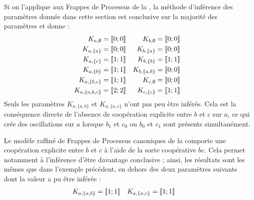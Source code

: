 \begin{example}
  Si on l'applique aux Frappes de Processus de la ,
  la méthode d'inférence des paramètres donnée dans cette section est conclusive sur la majorité
  des paramètres et donne :
  \begin{align*}
    K_{a, \emptyset} &= \mathopen{\llbracket}0\mathclose{};0\mathclose{\rrbracket} &
    K_{b, \emptyset} &= \mathopen{\llbracket}0\mathclose{};0\mathclose{\rrbracket} \\
    K_{a, \{a\}} &= \mathopen{\llbracket}0\mathclose{};0\mathclose{\rrbracket} &
    K_{b, \{a\}} &= \mathopen{\llbracket}0\mathclose{};0\mathclose{\rrbracket} \\
    K_{a, \{c\}} &= \mathopen{\llbracket}1\mathclose{};1\mathclose{\rrbracket} &
    K_{b, \{b\}} &= \mathopen{\llbracket}1\mathclose{};1\mathclose{\rrbracket} \\
    K_{a, \{b\}} &= \mathopen{\llbracket}1\mathclose{};1\mathclose{\rrbracket} &
    K_{b, \{a,b\}} &= \mathopen{\llbracket}0\mathclose{};0\mathclose{\rrbracket} \\
    K_{a, \{b,c\}} &= \mathopen{\llbracket}1\mathclose{};1\mathclose{\rrbracket} &
    K_{c, \emptyset} &= \mathopen{\llbracket}0\mathclose{};0\mathclose{\rrbracket} \\
    K_{a, \{a,b,c\}} &= \mathopen{\llbracket}2\mathclose{};2\mathclose{\rrbracket} &
    K_{c, \{c\}} &= \mathopen{\llbracket}1\mathclose{};1\mathclose{\rrbracket} \\
  \end{align*}
  Seuls les paramètres $K_{a,\{a,b\}}$ et $K_{a,\{a,c\}}$ n'ont pas peu être inférés.
  Cela est la conséquence directe de l'absence de coopération explicite entre $b$ et $c$ sur $a$,
  ce qui crée des oscillations sur $a$ lorsque $b_1$ et $c_0$ ou $b_0$ et $c_1$
  sont présents simultanément.
\end{example}

\begin{example}
  Le modèle raffiné de Frappes de Processus canoniques de la 
  comporte une coopération explicite entre $b$ et $c$ à l'aide de la sorte coopérative $bc$.
  Cela permet notamment à l'inférence d'être davantage conclusive ;
  ainsi, les résultats sont les mêmes que dans l'exemple précédent,
  en dehors des deux paramètres suivants dont la valeur a pu être inférée :
  \begin{align*}
    K_{a,\{a,b\}} &= \mathopen{\llbracket}1\mathclose{};1\mathclose{\rrbracket} &
    K_{a,\{a,c\}} &= \mathopen{\llbracket}1\mathclose{};1\mathclose{\rrbracket}
  \end{align*}
\end{example}



\myskip

